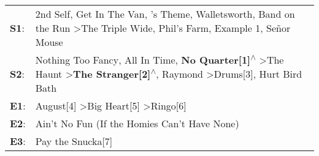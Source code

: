 \begin{supertabular}{p{0.03\textwidth}p{0.92\textwidth}}
 \textbf{S1}:  &                    2nd Self\textsuperscript{}, \enspace Get In The Van\textsuperscript{}, 's Theme\textsuperscript{}, \enspace Walletsworth\textsuperscript{}, \enspace Band on the Run\textsuperscript{} \textgreater \enspace The Triple Wide\textsuperscript{}, \enspace Phil's Farm\textsuperscript{}, \enspace Example 1\textsuperscript{}, \enspace Señor Mouse\textsuperscript{}  \enspace  \\
 \textbf{S2}:  &  Nothing Too Fancy\textsuperscript{}, \enspace All In Time\textsuperscript{}, \enspace \textbf{No Quarter[1]\textsuperscript{$\wedge$}} \textgreater \enspace The Haunt\textsuperscript{} \textgreater \enspace \textbf{The Stranger[2]\textsuperscript{$\wedge$}}, \enspace Raymond\textsuperscript{} \textgreater \enspace Drums[3]\textsuperscript{}, \enspace Hurt Bird Bath\textsuperscript{}  \enspace  \\
 \textbf{E1}:  &                                                                                                                                                                                                                                                                  August[4]\textsuperscript{} \textgreater \enspace Big Heart[5]\textsuperscript{} \textgreater \enspace Ringo[6]\textsuperscript{}  \enspace  \\
 \textbf{E2}:  &                                                                                                                                                                                                                                                                                                                                     Ain't No Fun (If the Homies Can't Have None)\textsuperscript{}  \enspace  \\
 \textbf{E3}:  &                                                                                                                                                                                                                                                                                                                                                                Pay the Snucka[7]\textsuperscript{}  \enspace  \\
\end{supertabular}
